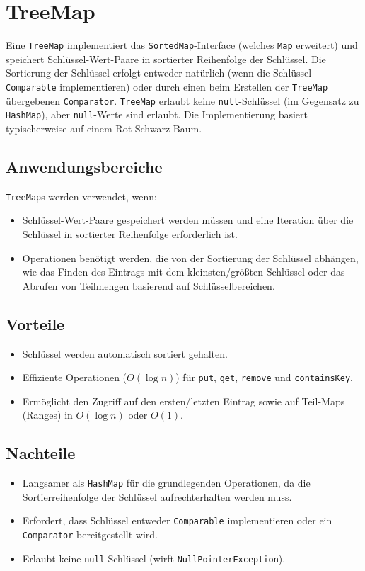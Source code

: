 \section{TreeMap}
Eine \texttt{TreeMap} implementiert das \texttt{SortedMap}-Interface (welches \texttt{Map} erweitert) und speichert Schlüssel-Wert-Paare in sortierter Reihenfolge der Schlüssel. Die Sortierung der Schlüssel erfolgt entweder natürlich (wenn die Schlüssel \texttt{Comparable} implementieren) oder durch einen beim Erstellen der \texttt{TreeMap} übergebenen \texttt{Comparator}. \texttt{TreeMap} erlaubt keine \texttt{null}-Schlüssel (im Gegensatz zu \texttt{HashMap}), aber \texttt{null}-Werte sind erlaubt. Die Implementierung basiert typischerweise auf einem Rot-Schwarz-Baum.

\subsection{Anwendungsbereiche}
\texttt{TreeMap}s werden verwendet, wenn:
\begin{itemize}
    \item Schlüssel-Wert-Paare gespeichert werden müssen und eine Iteration über die Schlüssel in sortierter Reihenfolge erforderlich ist.
    \item Operationen benötigt werden, die von der Sortierung der Schlüssel abhängen, wie das Finden des Eintrags mit dem kleinsten/größten Schlüssel oder das Abrufen von Teilmengen basierend auf Schlüsselbereichen.
\end{itemize}

\subsection{Vorteile}
\begin{itemize}
    \item Schlüssel werden automatisch sortiert gehalten.
    \item Effiziente Operationen ($O(\log n)$) für \texttt{put}, \texttt{get}, \texttt{remove} und \texttt{containsKey}.
    \item Ermöglicht den Zugriff auf den ersten/letzten Eintrag sowie auf Teil-Maps (Ranges) in $O(\log n)$ oder $O(1)$.
\end{itemize}

\subsection{Nachteile}
\begin{itemize}
    \item Langsamer als \texttt{HashMap} für die grundlegenden Operationen, da die Sortierreihenfolge der Schlüssel aufrechterhalten werden muss.
    \item Erfordert, dass Schlüssel entweder \texttt{Comparable} implementieren oder ein \texttt{Comparator} bereitgestellt wird.
    \item Erlaubt keine \texttt{null}-Schlüssel (wirft \texttt{NullPointerException}).
\end{itemize}

